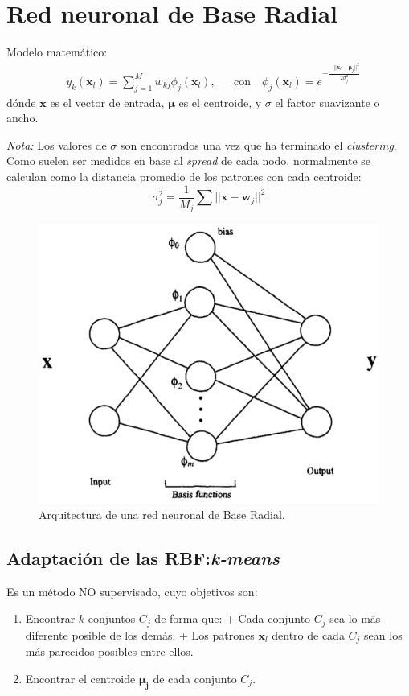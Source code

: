 \documentclass[10pt,a4paper]{article}
\begin{document}
\section{Red neuronal de Base Radial}

Modelo matemático:
\begin{align*}
&y_k (\mathbf{x}_l) = \sum_{j=1}^M w_{kj} \phi_j (\mathbf{x}_l), 
&&\text{con} \quad \phi_j (\mathbf{x}_l) = e^{-\frac{-||\mathbf{x}_l - \mathbf{\mu}_j||^2}{2 \sigma_j^2}}
\end{align*}
dónde $\mathbf{x}$ es el vector de entrada, $\mathbf{\mu}$ es el centroide, y $\sigma$ el factor suavizante o ancho.

\textit{Nota:} Los valores de $\sigma$ son encontrados una vez que ha terminado el \textit{clustering}. Como suelen ser medidos en base al \textit{spread} de cada nodo, normalmente se calculan como la distancia promedio de los patrones con cada centroide:
\[\sigma_j^2 = \frac{1}{M_j} \sum ||\mathbf{x} - \mathbf{w}_j||^2\]

\begin{figure}
  \label{fig:radial}
  \caption{Arquitectura de una red neuronal de Base Radial.}
  \centering
  \hbox{\includegraphics[width=0.5\textwidth-\fboxrule-\fboxrule]{radial.png}}  
\end{figure}	

\subsection{Adaptación de las RBF:\textit{k-means}}
Es un método NO supervisado, cuyo objetivos son:
\begin{enumerate}
\item Encontrar $k$ conjuntos $C_j$ de forma que:
\subitem + Cada conjunto $C_j$ sea lo más diferente posible de los demás.
\subitem + Los patrones $\mathbf{x}_l$ dentro de cada $C_j$ sean los más parecidos posibles entre ellos.
\item Encontrar el centroide $\mathbf{\mu_j}$ de cada conjunto $C_j$.
\end{enumerate}
\end{document}
